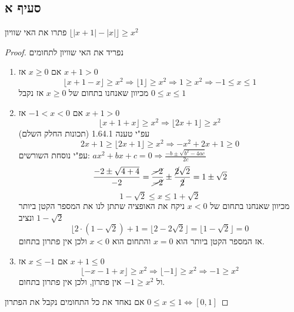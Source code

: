 \documentclass{article}
\begin{document}
	\subsection*{סעיף א}
	פתרו את האי שוויון
	$\lfloor |x+1| - |x| \rfloor \geq x^2$
	\begin{proof}
		נפריד את האי שוויון לתחומים
		\begin{enumerate}[I]
			\item אם $x \geq 0$ אז $x + 1 > 0$
			\[
				\lfloor x + 1 - x \rfloor \geq x^2 \Rightarrow
				\lfloor 1 \rfloor \geq x^2 \Rightarrow
				1 \geq x^2 \Rightarrow
				-1 \leq x \leq 1
			\]
				מכיוון שאנחנו בתחום של $x \geq 0$ אז נקבל $0 \leq x \leq 1$
			\item אם $-1 < x < 0$ אז $x+1 > 0$
			\[
				\lfloor x + 1 + x \rfloor \geq x^2 \Rightarrow
				\lfloor 2x+1 \rfloor \geq x^2
			\]
			עפ"י טענה 1.64.1 (תכונות החלק השלם)
			\[
				2x + 1 \geq \lfloor 2x + 1 \rfloor \geq x^2 \Rightarrow
				-x^2 + 2x + 1 \geq 0
			\]
			עפ"י נוסחת השורשים:
			$ax^2 + bx + c = 0 \Rightarrow \frac{-b \pm \sqrt{b^2 -4ac}}{2c}$
			\[
			\frac{-2 \pm \sqrt{4+4}}{-2} =
			\frac{\cancel{-2}}{\cancel{-2}} \pm \frac{\cancel{2}\sqrt{2}}{\cancel{2}} =
			1 \pm \sqrt{2}
			 \]
			 \[ 1 - \sqrt{2} \leq x \leq 1 + \sqrt{2} \]
			 מכיוון שאנחנו בתחום של $x < 0$
			ניקח את האופציה שתתן לנו את המספר הקטן ביותר ונציב $1 - \sqrt{2}$
			 \[
			 	\lfloor2 \cdot (1 - \sqrt{2}) + 1 = \lfloor 2 - 2\sqrt{2} \rfloor = \lfloor 1 - \sqrt{2} \rfloor = 0
			 \]
 			 אז המספר הקטן ביותר הוא $x=0$ והתחום הוא $x<0$ ולכן אין פתרון בתחום.
 			 \item אם $x \leq -1$ אז $x + 1 \leq 0$
 			 \[
 			 	\lfloor -x -1 +x \rfloor \geq x^2 \Rightarrow
 			 	\lfloor -1 \rfloor \geq x^2 \Rightarrow
 			 	-1 \geq x^2
 			 \]
 			 ול $-1 \geq x^2 $ אין פתרון, ולכן אין פתרון בתחום.
		\end{enumerate}
	אם נאחד את כל התחומים נקבל את הפתרון
	$0 \leq x \leq 1 \iff [0,1]$
	\end{proof}

	\pagebreak
\end{document}
